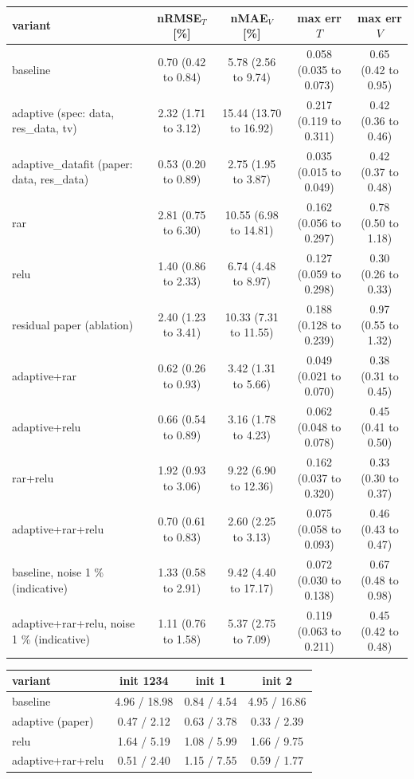 \begin{tabular}{lcccc}
\toprule
variant & nRMSE$_T$ [\%] & nMAE$_V$ [\%] & max err $T$ & max err $V$ \\
\midrule
baseline & 0.70 (0.42 to 0.84) & 5.78 (2.56 to 9.74) & 0.058 (0.035 to 0.073) & 0.65 (0.42 to 0.95) \\
adaptive (spec: data, res\_data, tv) & 2.32 (1.71 to 3.12) & 15.44 (13.70 to 16.92) & 0.217 (0.119 to 0.311) & 0.42 (0.36 to 0.46) \\
adaptive\_datafit (paper: data, res\_data) & 0.53 (0.20 to 0.89) & 2.75 (1.95 to 3.87) & 0.035 (0.015 to 0.049) & 0.42 (0.37 to 0.48) \\
rar & 2.81 (0.75 to 6.30) & 10.55 (6.98 to 14.81) & 0.162 (0.056 to 0.297) & 0.78 (0.50 to 1.18) \\
relu & 1.40 (0.86 to 2.33) & 6.74 (4.48 to 8.97) & 0.127 (0.059 to 0.298) & 0.30 (0.26 to 0.33) \\
residual paper (ablation) & 2.40 (1.23 to 3.41) & 10.33 (7.31 to 11.55) & 0.188 (0.128 to 0.239) & 0.97 (0.55 to 1.32) \\
adaptive+rar & 0.62 (0.26 to 0.93) & 3.42 (1.31 to 5.66) & 0.049 (0.021 to 0.070) & 0.38 (0.31 to 0.45) \\
adaptive+relu & 0.66 (0.54 to 0.89) & 3.16 (1.78 to 4.23) & 0.062 (0.048 to 0.078) & 0.45 (0.41 to 0.50) \\
rar+relu & 1.92 (0.93 to 3.06) & 9.22 (6.90 to 12.36) & 0.162 (0.037 to 0.320) & 0.33 (0.30 to 0.37) \\
adaptive+rar+relu & 0.70 (0.61 to 0.83) & 2.60 (2.25 to 3.13) & 0.075 (0.058 to 0.093) & 0.46 (0.43 to 0.47) \\
baseline, noise 1 \% (indicative) & 1.33 (0.58 to 2.91) & 9.42 (4.40 to 17.17) & 0.072 (0.030 to 0.138) & 0.67 (0.48 to 0.98) \\
adaptive+rar+relu, noise 1 \% (indicative) & 1.11 (0.76 to 1.58) & 5.37 (2.75 to 7.09) & 0.119 (0.063 to 0.211) & 0.45 (0.42 to 0.48) \\
\bottomrule
\end{tabular}

\begin{tabular}{lccc}
\toprule
variant & init 1234 & init 1 & init 2 \\
\midrule
baseline & 4.96 / 18.98 & 0.84 / 4.54 & 4.95 / 16.86 \\
adaptive (paper) & 0.47 / 2.12 & 0.63 / 3.78 & 0.33 / 2.39 \\
relu & 1.64 / 5.19 & 1.08 / 5.99 & 1.66 / 9.75 \\
adaptive+rar+relu & 0.51 / 2.40 & 1.15 / 7.55 & 0.59 / 1.77 \\
\bottomrule
\end{tabular}
